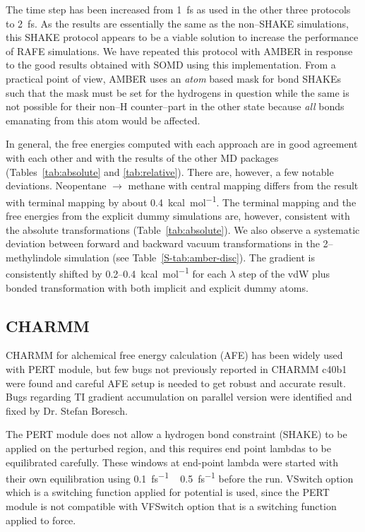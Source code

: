 \documentclass[journal=jctcce,manuscript=article]{achemso}
\begin{document}
The time step has been increased from \SI{1}{fs} as used in the other 
three protocols to \SI{2}{fs}.  As the results are essentially the same as the 
non--SHAKE simulations, this SHAKE protocol appears to be a viable solution to 
increase the performance of RAFE simulations.  We have repeated this protocol 
with AMBER in response to the good results obtained with SOMD using this 
implementation.  From a practical point of view, AMBER uses an \emph{atom} 
based mask for bond SHAKEs such that the mask must be set for the hydrogens in 
question while the same is not possible for their non--H counter--part in the 
other state because \emph{all} bonds emanating from this atom would be affected.

In general, the free energies computed with each approach are in good agreement 
with each other and with the results of the other MD packages 
(Tables~\ref{tab:absolute} and \ref{tab:relative}).  There are, however, a few 
notable deviations.  Neopentane $\rightarrow$ methane with central mapping 
differs from the result with terminal mapping by about 
\SI{0.4}{kcal.mol^{-1}}.  The terminal mapping and the free energies from the 
explicit dummy simulations are, however, consistent with the absolute 
transformations (Table~\ref{tab:absolute}).  We also observe a systematic 
deviation between forward and backward vacuum transformations in the 
2--methylindole simulation (see Table~\ref{S-tab:amber-disc}).  The gradient 
is consistently shifted by 0.2--\SI{0.4}{kcal.mol^{-1}} for each $\lambda$ step 
of the vdW plus bonded transformation with both implicit and explicit dummy 
atoms.


\subsection{CHARMM}
\label{sec:charmm-results}

CHARMM for alchemical free energy calculation (AFE) has been widely used with PERT module, but few bugs not previously reported in CHARMM c40b1 were found and careful AFE setup is needed to get robust and accurate result. Bugs regarding TI gradient accumulation on parallel version were identified and fixed by Dr. Stefan Boresch.

The PERT module does not allow a hydrogen bond constraint (SHAKE) to be applied on the perturbed region, and this requires end point lambdas to be equilibrated
carefully. These windows at end-point lambda were started with their own equilibration using \SI{0.1}{fs^{-1}} ~ \SI{0.5}{fs^{-1}} before the run. VSwitch option which is a switching function applied for potential is used, since the PERT module is not compatible with VFSwitch option that is a switching function applied to force.
\end{document}
